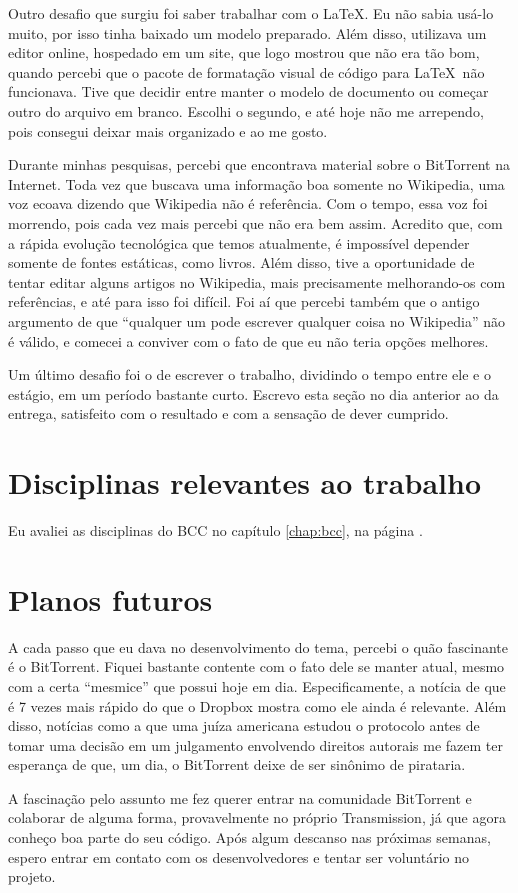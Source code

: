 Outro desafio que surgiu foi saber trabalhar com o \LaTeX. Eu não sabia usá-lo muito,
por isso tinha baixado um modelo preparado. Além disso, utilizava um editor online,
hospedado em um site, que logo mostrou que não era tão bom, quando percebi que o pacote
de formatação visual de código para \LaTeX\, não funcionava. Tive que decidir entre
manter o modelo de documento ou começar outro do arquivo em branco. Escolhi o segundo,
e até hoje não me arrependo, pois consegui deixar mais organizado e ao me gosto.

Durante minhas pesquisas, percebi que encontrava material sobre o BitTorrent na
Internet. Toda vez que buscava uma informação boa somente no Wikipedia, uma voz ecoava
dizendo que Wikipedia não é referência. Com o tempo, essa voz foi morrendo, pois cada
vez mais percebi que não era bem assim. Acredito que, com a rápida evolução tecnológica
que temos atualmente, é impossível depender somente de fontes estáticas, como livros.
Além disso, tive a oportunidade de tentar editar alguns artigos no Wikipedia, mais
precisamente melhorando-os com referências, e até para isso foi difícil. Foi aí que
percebi também que o antigo argumento de que ``qualquer um pode escrever qualquer coisa
no Wikipedia'' não é válido, e comecei a conviver com o fato de que eu não teria opções
melhores.

Um último desafio foi o de escrever o trabalho, dividindo o tempo entre ele e o
estágio, em um período bastante curto. Escrevo esta seção no dia anterior ao da entrega,
satisfeito com o resultado e com a sensação de dever cumprido.

\section*{Disciplinas relevantes ao trabalho}

Eu avaliei as disciplinas do BCC no capítulo \ref{chap:bcc}, na página \pageref{chap:bcc}.

\section*{Planos futuros}

A cada passo que eu dava no desenvolvimento do tema, percebi o quão fascinante é o
BitTorrent. Fiquei bastante contente com o fato dele se manter atual, mesmo com a certa
``mesmice'' que possui hoje em dia. Especificamente, a notícia de que é 7 vezes mais
rápido do que o Dropbox \cite{site:torrentvsdropbox} mostra como ele ainda é relevante.
Além disso, notícias como a que uma juíza americana estudou o protocolo antes de tomar
uma decisão em um julgamento envolvendo direitos autorais \cite{site:juizamanjona} me
fazem ter esperança de que, um dia, o BitTorrent deixe de ser sinônimo de pirataria.

A fascinação pelo assunto me fez querer entrar na comunidade BitTorrent e colaborar de
alguma forma, provavelmente no próprio Transmission, já que agora conheço boa parte do
seu código. Após algum descanso nas próximas semanas, espero entrar em contato com os
desenvolvedores e tentar ser voluntário no projeto.



\afterpage{\clearpage}